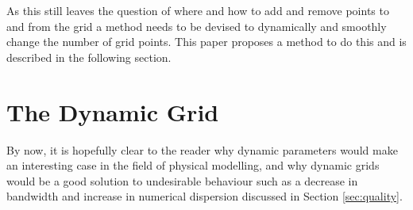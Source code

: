 \documentclass[dvipsnames, reprint]{JASA}
\def\SWcomment[#1]{\textcolor{Bittersweet}{#1}}
\begin{document}
As this still leaves the question of where and how to add and remove points to and from the grid
a method needs to be devised to dynamically and smoothly change the number of grid points. This paper proposes a method to do this and is described in the following section. %




\section{The Dynamic Grid}
By now, it is hopefully clear to the reader why dynamic parameters would make an interesting case in the field of physical modelling, and why dynamic grids would be a good solution to undesirable behaviour such as a decrease in bandwidth and increase in numerical dispersion discussed in Section \ref{sec:quality}. %
\end{document}
